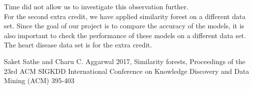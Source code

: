 \documentclass{article}
\begin{document}
\noindent Time did not allow us to investigate this observation further.\\

 

\noindent For the second extra credit, we have applied similarity forest on a different data set. Since the goal of our project is to compare the accuracy of the models, it is also important to check the performance of these models on a different data set. The heart disease data set is for the extra credit.\\


\newpage



\begin{thebibliography}{}
 Saket Sathe and Charu C. Aggarwal  2017,
      Similarity forests,
     Proceedings of the 23rd ACM SIGKDD International Conference on Knowledge Discovery     and Data Mining
      (ACM) 395-403

\end{thebibliography}
\end{document}
